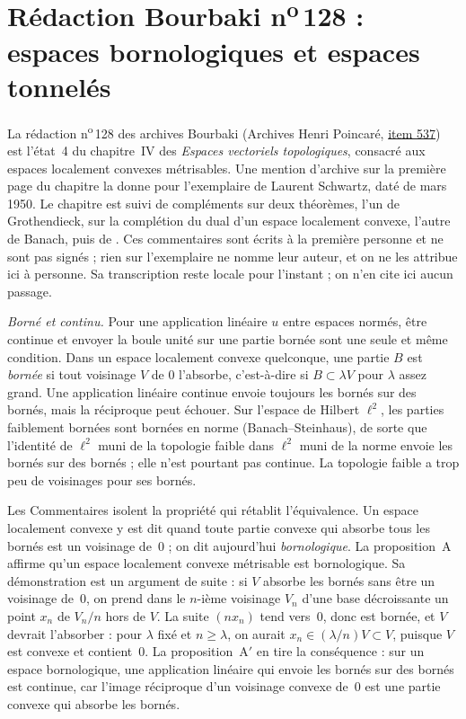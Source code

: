 \section[Rédaction Bourbaki n\textsuperscript{o}\,128 : espaces bornologiques et tonnelés]{Rédaction Bourbaki n\textsuperscript{o}\,128 : espaces bornologiques et espaces tonnelés\protect{}}\label{sec:bourbaki-128}

La rédaction n\textsuperscript{o}\,128 des archives Bourbaki (Archives Henri Poincaré, \href{https://archives-bourbaki.ahp-numerique.fr/items/show/537}{item 537}) est l'état~4 du chapitre~IV des \emph{Espaces vectoriels topologiques}, consacré aux espaces localement convexes métrisables. Une mention d'archive sur la première page du chapitre la donne pour l'exemplaire de Laurent Schwartz, daté de mars 1950. Le chapitre est suivi de compléments sur deux théorèmes, l'un de Grothendieck, sur la complétion du dual d'un espace localement convexe, l'autre de Banach, puis de . Ces commentaires sont écrits à la première personne et ne sont pas signés ; rien sur l'exemplaire ne nomme leur auteur, et on ne les attribue ici à personne. Sa transcription reste locale pour l'instant ; on n'en cite ici aucun passage.

\emph{Borné et continu.} Pour une application linéaire $u$ entre espaces normés, être continue et envoyer la boule unité sur une partie bornée sont une seule et même condition. Dans un espace localement convexe quelconque, une partie $B$ est \emph{bornée} si tout voisinage $V$ de $0$ l'absorbe, c'est-à-dire si $B \subset \lambda V$ pour $\lambda$ assez grand. Une application linéaire continue envoie toujours les bornés sur des bornés, mais la réciproque peut échouer. Sur l'espace de Hilbert $\ell^2$, les parties faiblement bornées sont bornées en norme (Banach--Steinhaus), de sorte que l'identité de $\ell^2$ muni de la topologie faible dans $\ell^2$ muni de la norme envoie les bornés sur des bornés ; elle n'est pourtant pas continue. La topologie faible a trop peu de voisinages pour ses bornés.

Les Commentaires isolent la propriété qui rétablit l'équivalence. Un espace localement convexe y est dit  quand toute partie convexe qui absorbe tous les bornés est un voisinage de~$0$ ; on dit aujourd'hui \emph{bornologique}. La proposition~A affirme qu'un espace localement convexe métrisable est bornologique. Sa démonstration est un argument de suite : si $V$ absorbe les bornés sans être un voisinage de~$0$, on prend dans le $n$-ième voisinage $V_n$ d'une base décroissante un point $x_n$ de $V_n/n$ hors de $V$. La suite $(nx_n)$ tend vers~$0$, donc est bornée, et $V$ devrait l'absorber : pour $\lambda$ fixé et $n \geq \lambda$, on aurait $x_n \in (\lambda/n)V \subset V$, puisque $V$ est convexe et contient~$0$. La proposition~A$'$ en tire la conséquence : sur un espace bornologique, une application linéaire qui envoie les bornés sur des bornés est continue, car l'image réciproque d'un voisinage convexe de~$0$ est une partie convexe qui absorbe les bornés.

